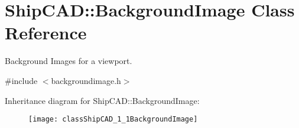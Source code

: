 \hypertarget{classShipCAD_1_1BackgroundImage}{}\section{Ship\+C\+AD\+:\+:Background\+Image Class Reference}
\label{classShipCAD_1_1BackgroundImage}


Background Images for a viewport.  




{\ttfamily \#include $<$backgroundimage.\+h$>$}

Inheritance diagram for Ship\+C\+AD\+:\+:Background\+Image\+:\begin{figure}[H]
\begin{center}
\leavevmode
\texttt{[image: classShipCAD\_1\_1BackgroundImage]}
\end{center}
\end{figure}
